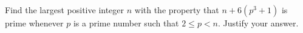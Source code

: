 Find the largest positive integer $n$ with the property that $n + 6(p^3 + 1)$
is prime whenever $p$ is a prime number such that $2 \le p < n$. Justify your
answer.
